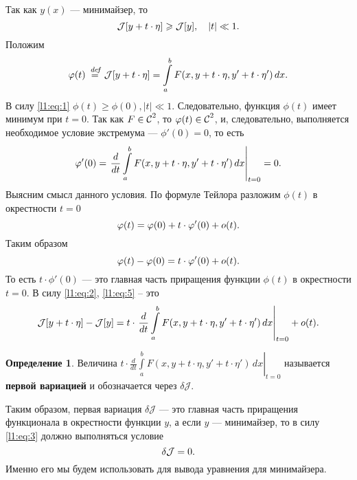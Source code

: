 \documentclass[12pt,a4paper,openany,fleqn]{book}
\newcommand {\defeq}{\stackrel{\hspace{0.09 cm}de\!f}{=}}
\newcommand {\eqdef}{\defeq}
\newcommand{\Cf}{\ensuremath{\mathcal{C}}}
\newcommand{\J}{\ensuremath{\mathcal{J}}}
\newcommand{\Cfn}[2][]{\ensuremath{\Cf{\mathstrut}^{#2}_{#1}}}
\newcommand{\der}[2]{\ensuremath{\frac{d#1}{d#2}}}
\newcommand{\dd}{\ensuremath{d}}
\theoremstyle{definition}
\newtheorem{_def}{Определение}[section]
\begin{document}
	Так как $y(x)$ --- минимайзер, то 
	\begin{equation}
		\label{l1:eq:1}
		\hfill\J[y+t\cdot\eta]\geqslant\J[y],\quad |t|\ll1.\hfill
	\end{equation}
	Положим 
	\begin{equation}
		\label{l1:eq:2}
		\hfill\phi(t)\eqdef\J[y+t\cdot\eta]=\int\limits_a^b F(x,y+t\cdot\eta,y'+t\cdot\eta')\,\dd{x}.\hfill
	\end{equation}
	В силу \eqref{l1:eq:1} $\phi(t)\geqslant\phi(0), |t|\ll1$. Следовательно, функция $\phi(t)$ имеет минимум при $t=0$. Так как $F\in\Cfn[]{2}$, то $\phi(t)\in\Cfn[]{2}$, и, следовательно, выполняется необходимое условие экстремума --- $\phi'(0)=0$, то есть
	\begin{equation}
		\label{l1:eq:3}
		\hfill\phi'(0)=\left.\der{}{t}\int\limits_a^b F(x,y+t\cdot\eta,y'+t\cdot\eta')\,\dd{x}\right|_{t=0}=0.\hfill
	\end{equation}
	Выясним смысл данного условия. По формуле Тейлора разложим $\phi(t)$ в окрестности $t=0$
	\begin{equation}
		\label{l1:eq:4}
		\hfill\phi(t)=\phi(0)+t\cdot\phi'(0)+o(t).\hfill
	\end{equation}
	Таким образом
	\begin{equation}
		\label{l1:eq:5}
		 \hfill\phi(t)-\phi(0)=t\cdot\phi'(0)+o(t).\hfill
	\end{equation}
	То есть $t\cdot\phi'(0)$ --- это главная часть приращения функции $\phi(t)$ в окрестности $t=0$. В силу \eqref{l1:eq:2}, \eqref{l1:eq:5} -- это 
	\begin{equation}
		\label{l1:eq:6}
		\hfill\J[y+t\cdot\eta]-\J[y]=t\cdot\left.\der{}{t}\int\limits_a^b F(x,y+t\cdot\eta,y'+t\cdot\eta')\,\dd{x}\right|_{t=0}+o(t).\hfill
	\end{equation}
	\begin{_def}
		Величина $t\cdot\left.\der{}{t}\int\limits_a^b F(x,y+t\cdot\eta,y'+t\cdot\eta')\,\dd{x}\right|_{t=0}$ называется \textbf{первой вариацией} и обозначается через $\delta\J$.
	\end{_def}
	
	Таким образом, первая вариация $\delta\J$ --- это главная часть приращения функционала в окрестности функции $y$, а если $y$ --- минимайзер, то в силу \eqref{l1:eq:3} должно выполняться условие
	\begin{equation}
		\label{l1:eq:7}
		\hfill\delta\J=0.\hfill
	\end{equation}
	Именно его мы будем использовать для вывода уравнения для минимайзера.
	
\end{document}
